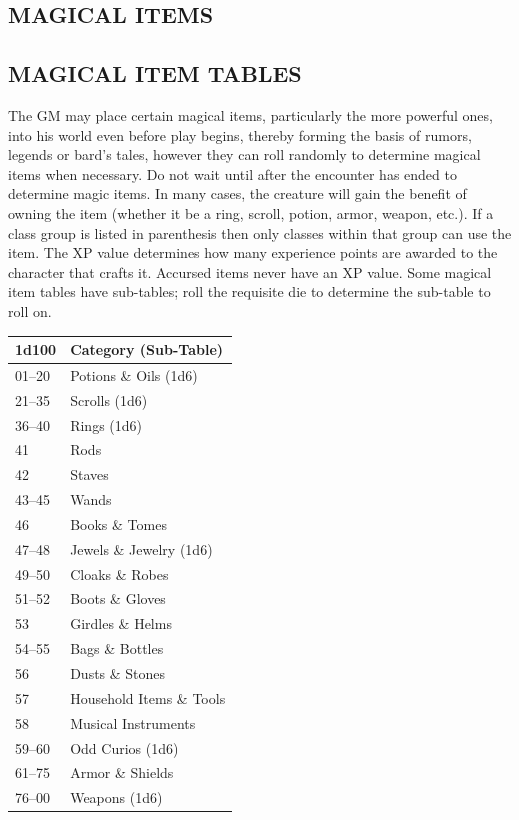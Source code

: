 \begin{multicols}{2}
\begin{minipage}{\columnwidth}
\end{minipage}

\section{MAGICAL ITEMS}

\subsection{MAGICAL ITEM TABLES}

The GM may place certain magical items, particularly the more powerful ones, into his world even before play begins, thereby forming the basis of rumors, legends or bard's tales, however they can roll randomly to determine magical items when necessary.  Do not wait until after the encounter has ended to determine magic items.  In many cases, the creature will gain the benefit of owning the item (whether it be a ring, scroll, potion, armor, weapon, etc.).  If a class group is listed in parenthesis then only classes within that group can use the item.  The XP value determines how many experience points are awarded to the character that crafts it.  Accursed items never have an XP value.  Some magical item tables have sub-tables; roll the requisite die to determine the sub-table to roll on.

\noindent
\begin{minipage}{\columnwidth}

\label{magicitems}
\noindent
\begin{tabular}{|p{}|p{}|}
\hline
1d100	& Category (Sub-Table) \\
\hline\hline
\rowcolor[gray]{.9}01--20	& Potions \& Oils (1d6) \\
21--35	& Scrolls (1d6) \\
\rowcolor[gray]{.9}36--40	& Rings (1d6) \\
41	& Rods \\
\rowcolor[gray]{.9}42	& Staves \\
43--45	& Wands \\
\rowcolor[gray]{.9}46	& Books \& Tomes \\
47--48	& Jewels \& Jewelry (1d6) \\
\rowcolor[gray]{.9}49--50	& Cloaks \& Robes \\
51--52	& Boots \& Gloves \\
\rowcolor[gray]{.9}53	& Girdles \& Helms \\
54--55	& Bags \& Bottles \\
\rowcolor[gray]{.9}56	& Dusts \& Stones \\
57	& Household Items \& Tools \\
\rowcolor[gray]{.9}58	& Musical Instruments \\
59--60	& Odd Curios (1d6) \\
\rowcolor[gray]{.9}61--75	& Armor \& Shields \\
76--00	& Weapons (1d6) \\
\hline
\end{tabular}


\end{minipage}
\end{multicols}
